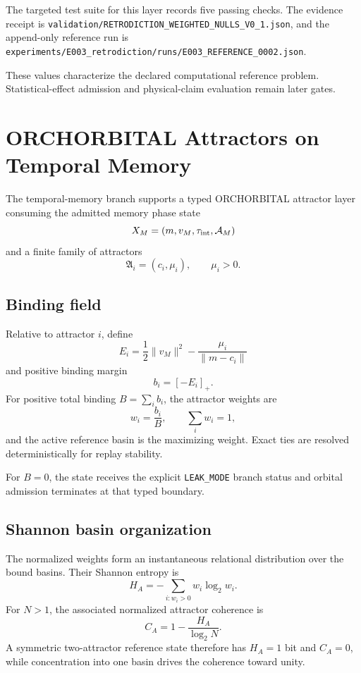 The targeted test suite for this layer records five passing checks. The evidence receipt is
\texttt{validation/RETRODICTION\_WEIGHTED\_NULLS\_V0\_1.json},
and the append-only reference run is
\texttt{experiments/E003\_retrodiction/runs/E003\_REFERENCE\_0002.json}.

These values characterize the declared computational reference problem. Statistical-effect admission and physical-claim evaluation remain later gates.


\chapter{ORCHORBITAL Attractors on Temporal Memory}

The temporal-memory branch supports a typed ORCHORBITAL attractor layer consuming the admitted memory phase state
\[
X_M=(m,v_M,\tau_{\rm int},\mathcal A_M)
\]
and a finite family of attractors
\[
\mathfrak A_i=(c_i,\mu_i),
\qquad \mu_i>0.
\]

\section{Binding field}

Relative to attractor \(i\), define
\[
\boxed{
E_i=\frac12\|v_M\|^2-\frac{\mu_i}{\|m-c_i\|}
}
\]
and positive binding margin
\[
\boxed{b_i=[-E_i]_+.}
\]
For positive total binding \(B=\sum_i b_i\), the attractor weights are
\[
\boxed{w_i=\frac{b_i}{B}},
\qquad
\sum_iw_i=1,
\]
and the active reference basin is the maximizing weight. Exact ties are resolved deterministically for replay stability.

For \(B=0\), the state receives the explicit \texttt{LEAK\_MODE} branch status and orbital admission terminates at that typed boundary.

\section{Shannon basin organization}

The normalized weights form an instantaneous relational distribution over the bound basins. Their Shannon entropy is
\[
\boxed{
H_A=-\sum_{i:w_i>0}w_i\log_2w_i.
}
\]
For \(N>1\), the associated normalized attractor coherence is
\[
\boxed{
C_A=1-\frac{H_A}{\log_2N}.
}
\]
A symmetric two-attractor reference state therefore has \(H_A=1\) bit and \(C_A=0\), while concentration into one basin drives the coherence toward unity.

